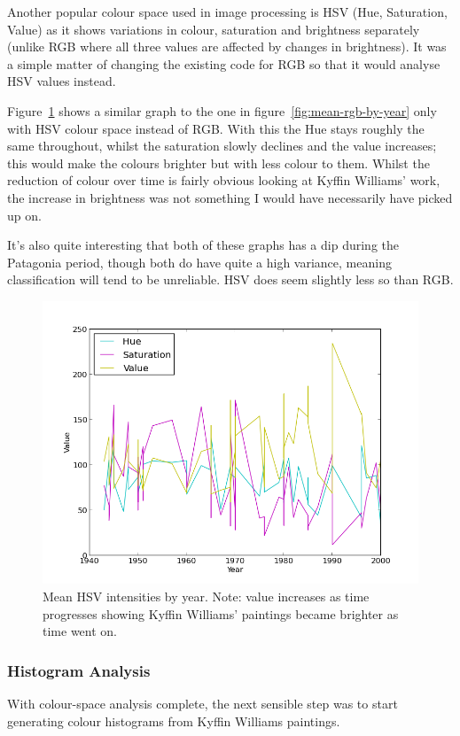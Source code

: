 \documentclass[11pt,fleqn,twoside]{article}
\begin{document}
Another popular colour space used in image processing is HSV (Hue, Saturation, Value) as it shows
variations in colour, saturation and brightness separately (unlike RGB where all three values are
affected by changes in brightness). It was a simple matter of changing the existing code for RGB
so that it would analyse HSV values instead.

Figure~\ref{fig:mean-hsv-by-year} shows a similar graph to the one in
figure~\ref{fig:mean-rgb-by-year} only with HSV colour space instead of RGB. With this the Hue 
stays roughly the same throughout, whilst the saturation slowly declines and the value increases;
this would make the colours brighter but with less colour to them. Whilst the reduction of colour
over time is fairly obvious looking at Kyffin Williams' work, the increase in brightness was not
something I would have necessarily have picked up on.

It's also quite interesting that both of these graphs has a dip during the Patagonia period, though
both do have quite a high variance, meaning classification will tend to be unreliable. HSV does 
seem slightly less so than RGB.

\begin{figure}[p]
\centering
\includegraphics[scale=0.5]{img/hsv-legend-12-11-01.png}
\caption{Mean HSV intensities by year. Note: value increases as time progresses showing Kyffin
Williams' paintings became brighter as time went on.}
\label{fig:mean-hsv-by-year}
\end{figure}

\clearpage
\subsubsection{Histogram Analysis}
With colour-space analysis complete, the next sensible step was to start generating colour 
histograms from Kyffin Williams paintings.
\end{document}
